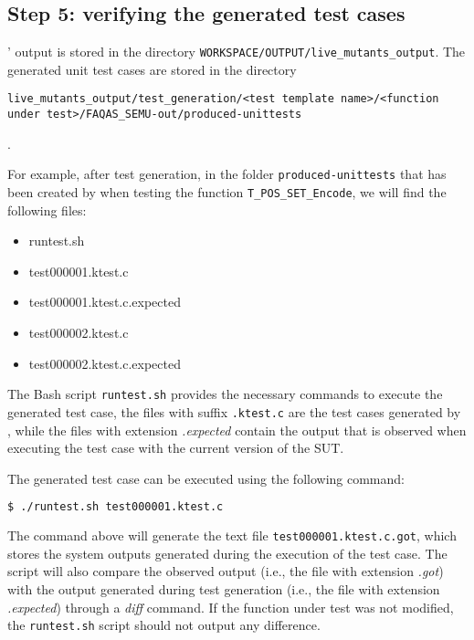 \subsection{Step 5: verifying the generated test cases}

\SEMUS' output is stored in the directory \texttt{WORKSPACE/OUTPUT/live\_mutants\_output}. The generated unit test cases are stored in the directory \begin{small}\texttt{live\_mutants\_output/test\_generation/<test template name>/<function under test>/FAQAS\_SEMU-out/produced-unittests}\end{small}.

For example, after test generation, in the folder \texttt{produced-unittests} that has been created by \SEMUS when testing the function \texttt{T\_POS\_SET\_Encode}, we will find the following files:

\begin{itemize}
\item runtest.sh
\item test000001.ktest.c
\item test000001.ktest.c.expected
\item test000002.ktest.c
\item test000002.ktest.c.expected
\end{itemize}

The Bash script \texttt{runtest.sh} provides the necessary commands to execute the generated test case, the files with suffix \texttt{.ktest.c}  are the test cases generated by \SEMUS, while the files with extension \emph{.expected} contain the output that is observed when executing the test case with the current version of the SUT.

The generated test case can be executed using the following command:

\begin{lstlisting}[language=bash]
 $ ./runtest.sh test000001.ktest.c
\end{lstlisting}

The command above will generate the text file \texttt{test000001.ktest.c.got}, which stores the system outputs generated during the execution of the test case. The script will also compare the observed output (i.e., the file with extension \emph{.got}) with the output generated during test generation (i.e., the file with extension \emph{.expected}) through a \emph{diff} command. If the function under test was not modified, the \texttt{runtest.sh} script should not output any difference.

